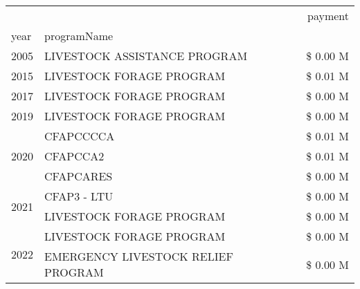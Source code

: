\begin{tabular}{llr}
\toprule
 &  & payment \\
year & programName &  \\
\midrule
2005 & LIVESTOCK ASSISTANCE PROGRAM & \$ 0.00 M \\
\cline{1-3}
2015 & LIVESTOCK FORAGE PROGRAM & \$ 0.01 M \\
\cline{1-3}
2017 & LIVESTOCK FORAGE PROGRAM & \$ 0.00 M \\
\cline{1-3}
2019 & LIVESTOCK FORAGE PROGRAM & \$ 0.00 M \\
\cline{1-3}
\multirow[t]{3}{*}{2020} & CFAPCCCCA & \$ 0.01 M \\
 & CFAPCCA2 & \$ 0.01 M \\
 & CFAPCARES & \$ 0.00 M \\
\cline{1-3}
\multirow[t]{2}{*}{2021} & CFAP3 - LTU & \$ 0.00 M \\
 & LIVESTOCK FORAGE PROGRAM & \$ 0.00 M \\
\cline{1-3}
\multirow[t]{2}{*}{2022} & LIVESTOCK FORAGE PROGRAM & \$ 0.00 M \\
 & EMERGENCY LIVESTOCK RELIEF PROGRAM & \$ 0.00 M \\
\cline{1-3}
\bottomrule
\end{tabular}
